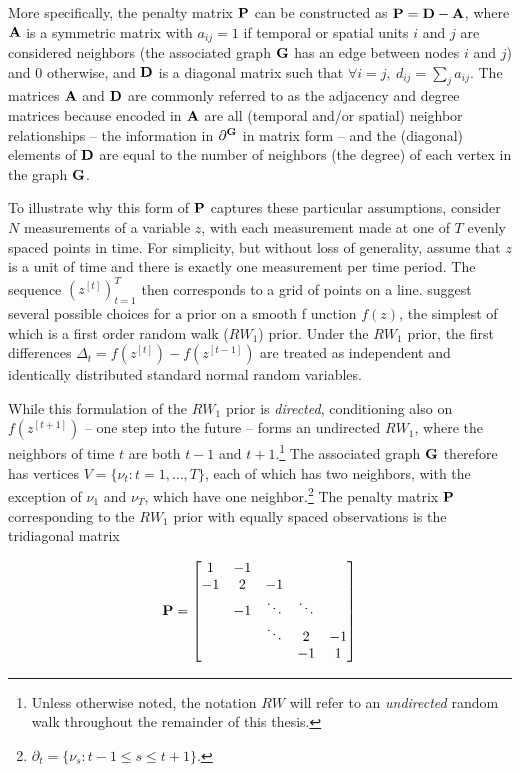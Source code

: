 More specifically, the penalty matrix $\mathbf{P}$ can be constructed as  
$\mathbf{P} = \mathbf{D} - \mathbf{A}$, where $\mathbf{A}$ is a symmetric matrix with 
$a_{ij} = 1$ if temporal or spatial units $i$ and $j$ are considered neighbors 
(the associated graph $\mathbf{G}$ has an edge between nodes $i$ and $j$) and 
0 otherwise, and $\mathbf{D}$ is a diagonal matrix such that 
$\forall i = j, \: d_{ij} = \sum_j a_{ij}$. The matrices $\mathbf{A}$ and $\mathbf{D}$ are 
commonly referred to as the adjacency and degree matrices because encoded in 
$\mathbf{A}$ are all (temporal and/or spatial) neighbor relationships -- the information 
in $\partial^{\mathbf{G}}$ in matrix form -- and the (diagonal) elements of $\mathbf{D}$ 
are equal to the number of neighbors (the degree) of each vertex in the 
graph $\mathbf{G}$. 

To illustrate why this form of $\mathbf{P}$ captures these particular assumptions, 
consider $N$ measurements of a variable $z$, with each measurement made at 
one of $T$ evenly spaced points in time. For simplicity, but without loss of generality,  
assume that $z$ is a unit of time and there is exactly one measurement per time period.  
The sequence $(z^{[t]})_{t=1}^T$ then corresponds to a grid of points on a line. 
 suggest several possible choices for a prior on a smooth f
unction $f(z)$, the simplest of which is a first order random walk ($RW_1$) prior.  Under 
the $RW_1$ prior, the first differences $\Delta_t = f(z^{[t]}) - f(z^{[t-1]})$ are treated as 
independent and identically distributed standard normal random variables. 

While this formulation of the $RW_1$ prior is {\it directed}, conditioning also on 
$f(z^{[t+1]})$ -- one step into the future -- forms an undirected $RW_1$, where 
the neighbors of time $t$ are both $t-1$ and $t+1$.\footnote{Unless otherwise 
noted, the notation $RW$ will refer to an {\it undirected} random walk throughout 
the remainder of this thesis.} The associated graph $\mathbf{G}$ therefore has vertices 
$V=\{\nu_t : t=1,\dots,T\}$, each of which has two neighbors, with the exception of 
$\nu_1$ and $\nu_T$, which have one neighbor.\footnote{$\partial_t = \{\nu_{s} : t - 1 \leq s \leq t + 1\}.$}  
The penalty matrix $\mathbf{P}$ corresponding to the $RW_1$ prior with equally 
spaced observations is the tridiagonal matrix

\begin{equation*}
\mathbf{P} = 
\begin{bmatrix}
1  	& -1 	& 		& 	& \\
-1  	& 2 	& -1 		& 	& \\
  	& -1 & \ddots 	& \ddots	& \\
  	&  	& \ddots 	& 2 	& -1\\
  	&  	& 		& -1 	& 1\\
\end{bmatrix}
\end{equation*}


